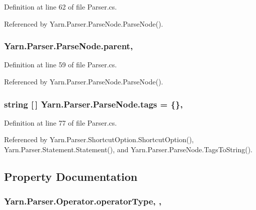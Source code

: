 Definition at line 62 of file Parser.\-cs.



Referenced by Yarn.\-Parser.\-Parse\-Node.\-Parse\-Node().

\hypertarget{a00148_af313a82103fcc2ff5a177dbb06b92f7b}{
\subsubsection[{parent}]{ Yarn.\-Parser.\-Parse\-Node.\-parent\hspace{0.3cm}{\ttfamily [package]}, {\ttfamily [inherited]}}}\label{a00148_af313a82103fcc2ff5a177dbb06b92f7b}


Definition at line 59 of file Parser.\-cs.



Referenced by Yarn.\-Parser.\-Parse\-Node.\-Parse\-Node().

\hypertarget{a00148_a58b3a15788fd2d4127d73619dc6d04ae}{
\subsubsection[{tags}]{\setlength{\rightskip}{0pt plus 5cm}string \mbox{[}$\,$\mbox{]} Yarn.\-Parser.\-Parse\-Node.\-tags = \{\}\hspace{0.3cm}{\ttfamily [package]}, {\ttfamily [inherited]}}}\label{a00148_a58b3a15788fd2d4127d73619dc6d04ae}


Definition at line 77 of file Parser.\-cs.



Referenced by Yarn.\-Parser.\-Shortcut\-Option.\-Shortcut\-Option(), Yarn.\-Parser.\-Statement.\-Statement(), and Yarn.\-Parser.\-Parse\-Node.\-Tags\-To\-String().



\subsection{Property Documentation}
\hypertarget{a00143_ac2de2f59be0e69b316627a4de16fadd3}{
\subsubsection[{operator\-Type}]{ Yarn.\-Parser.\-Operator.\-operator\-Type\hspace{0.3cm}{\ttfamily [get]}, {\ttfamily [set]}, {\ttfamily [package]}}}\label{a00143_ac2de2f59be0e69b316627a4de16fadd3}


